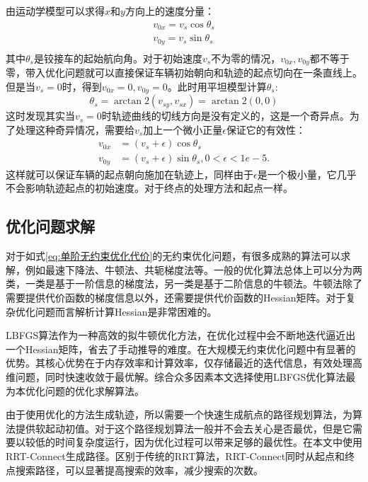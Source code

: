 \documentclass[master,academic]{ysuthesis} %
\begin{document}
		由运动学模型可以求得$x$和$y$方向上的速度分量：
		\begin{equation}
			\begin{aligned}
				v_{0x}=v_s\cos\theta _s\\
				v_{0y}=v_s\sin\theta _s\\
			\end{aligned}
		\end{equation}
		其中$\theta_s$是铰接车的起始航向角。对于初始速度$v_s$不为零的情况，$v_{0x},v_{0y}$都不等于零，带入优化问题就可以直接保证车辆初始朝向和轨迹的起点切向在一条直线上。但是当$v_{s}=0$时，得到$v_{0x}=0,v_{0y}=0$。此时用平坦模型计算$\theta_s$:
		\begin{equation}
			\theta_s=\arctan2 \left( v_{sy},v_{sx} \right) =\arctan2\left( 0,0 \right) 
		\end{equation}
		这时发现其实当$v_{s}=0$时轨迹曲线的切线方向是没有定义的，这是一个奇异点。为了处理这种奇异情况，需要给$v_{s}$加上一个微小正量$\epsilon$保证它的有效性：
		\begin{equation}
			\begin{aligned}
			v_{0x}&=\left( v_s+\epsilon \right) \cos\theta_s\\
			v_{0y}&=\left( v_s+\epsilon \right) \sin\theta_s,0<\epsilon <1e-5.
			\end{aligned}
		\end{equation}
		这样就可以保证车辆的起点朝向施加在轨迹上，同样由于$\epsilon$是一个极小量，它几乎不会影响轨迹起点的初始速度。对于终点的处理方法和起点一样。

		\subsection{优化问题求解}
		对于如式\ref{eq:单阶无约束优化代价}的无约束优化问题，有很多成熟的算法可以求解，例如最速下降法、牛顿法、共轭梯度法等。一般的优化算法总体上可以分为两类，一类是基于一阶信息的梯度法，另一类是基于二阶信息的牛顿法。牛顿法除了需要提供代价函数的梯度信息以外，还需要提供代价函数的Hessian矩阵。对于复杂优化问题而言解析计算Hessian是非常困难的。
		
		LBFGS算法作为一种高效的拟牛顿优化方法，在优化过程中会不断地迭代逼近出一个Hessian矩阵，省去了手动推导的难度。在大规模无约束优化问题中有显著的优势。其核心优势在于内存效率和计算效率，仅存储最近的迭代信息，有效处理高维问题，同时快速收敛于最优解。综合众多因素本文选择使用LBFGS优化算法最为本优化问题的优化求解算法。

		由于使用优化的方法生成轨迹，所以需要一个快速生成航点的路径规划算法，为算法提供软起动初值。对于这个路径规划算法一般并不会去关心是否最优，但是它需要以较低的时间复杂度运行，因为优化过程可以带来足够的最优性。在本文中使用RRT-Connect生成路径。区别于传统的RRT算法，RRT-Connect同时从起点和终点搜索路径，可以显著提高搜索的效率，减少搜索的次数。
\end{document}
